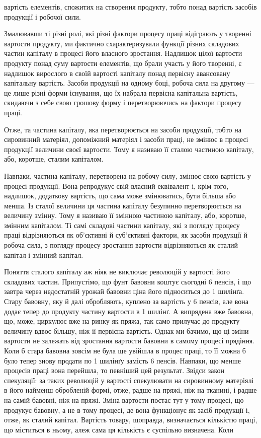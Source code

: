 \parcont{}  %
вартість елементів, спожитих на створення продукту, тобто понад вартість засобів продукції і робочої
сили.

Змалювавши ті різні ролі, які різні фактори процесу праці відіграють у творенні
вартости продукту, ми фактично схарактеризували функції різних складових частин
капіталу в процесі його власного зростання. Надлишок цілої вартости продукту
понад суму вартости елементів, що брали участь у його
творенні, є надлишок вирослого в своїй вартості капіталу понад первісну
авансовану капітальну вартість. Засоби продукції на одному боці, робоча сила
на другому — це лише різні форми існування, що їх набрала первісна капітальна
вартість, скидаючи з себе свою грошову форму і перетворюючись на
фактори процесу праці.

Отже, та частина капіталу, яка перетворюється на засоби продукції,
тобто на сировинний матеріял, допоміжний матеріял і засоби праці, не змінює в
процесі продукції величини своєї вартости. Тому я називаю її сталою частиною
капіталу, або, коротше, сталим капіталом.

Навпаки, частина капіталу, перетворена на робочу силу, змінює свою вартість у
процесі продукції. Вона репродукує свій власний еквівалент і, крім того,
надлишок, додаткову вартість, що сама може змінюватись, бути більша або менша.
Із сталої величини ця частина капіталу безупинно перетворюється
на величину змінну. Тому я називаю її змінною частиною капіталу, або, коротше,
змінним капіталом. Ті самі складові частини капіталу, які з погляду процесу
праці відрізняються як об’єктивні й суб’єктивні фактори, як засоби продукції й
робоча сила, з погляду процесу зростання вартости відрізняються як
сталий капітал і змінний капітал.

Поняття сталого капіталу аж ніяк не виключає революцій у вартості його складових
частин. Припустімо, що фунт бавовни коштує сьогодні 6 пенсів, і що завтра через
недостатній урожай бавовни ціна його підноситься до 1 шилінґа. Стару бавовну,
яку й далі обробляють, куплено за вартість у 6 пенсів, але вона додає тепер до
продукту частину вартости в 1 шилінґ. А випрядена вже бавовна, що, може,
циркулює вже на ринку як пряжа, так само прилучає до продукту величину вдвоє
більшу, ніж її первісна вартість. Однак ми бачимо, що ці зміни вартости не
залежать від зростання вартости бавовни в самому
процесі прядіння. Коли б стара бавовна зовсім не була ще увійшла в процес праці,
то її можна б було тепер знову продати по 1 шилінґу замість 6 пенсів. Навпаки,
що менше процесів праці вона перейшла, то певніший цей результат. Звідси закон
спекуляції: за таких революцій у вартості спекулювати на сировинному матеріялі
в його найменш обробленій формі, отже, радше на пряжі,
ніж на тканині, і радше на самій бавовні, ніж на пряжі. Зміна вартости постає
тут у тому процесі, що продукує бавовну, а не в тому процесі, де вона функціонує
як засіб продукції і, отже, як сталий капітал. Вартість товару, щоправда,
визначається кількістю праці, що міститься в ньому, алеж сама ця
кількість є суспільно визначена. Коли
\parbreak{}  %
